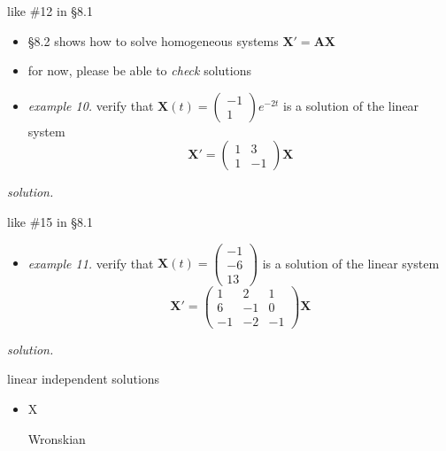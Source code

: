 \documentclass[urlcolor=blue,dvipsnames]{beamer}
\newcommand{\bA}{\mathbf{A}}
\newcommand{\bX}{\mathbf{X}}
\begin{document}
\begin{frame}{like \#12 in \S8.1}

\begin{itemize}
\item \S8.2 shows how to solve homogeneous systems $\bX' = \bA \bX$
\item for now, please be able to \emph{check} solutions
\item \emph{example 10.}  verify that $\displaystyle \bX(t)=\begin{pmatrix} -1 \\ 1 \end{pmatrix} e^{-2t}$ is a solution of the linear system
    $$\bX' = \begin{pmatrix} 1 & 3 \\ 1 & -1 \end{pmatrix} \bX$$
\end{itemize}

\noindent \emph{solution.}

\vspace{35mm}
\end{frame}


\begin{frame}{like \#15 in \S8.1}

\begin{itemize}
\item \emph{example 11.}  verify that $\displaystyle \bX(t)=\begin{pmatrix} -1 \\ -6 \\ 13 \end{pmatrix}$ is a solution of the linear system
    $$\bX' = \begin{pmatrix} 1 & 2 & 1 \\ 6 & -1 & 0 \\ -1 & -2 & -1 \end{pmatrix} \bX$$
\end{itemize}

\noindent \emph{solution.}

\vspace{35mm}
\end{frame}


\begin{frame}{linear independent solutions}

\begin{itemize}
\item X

Wronskian
\end{itemize}
\end{frame}
\end{document}
